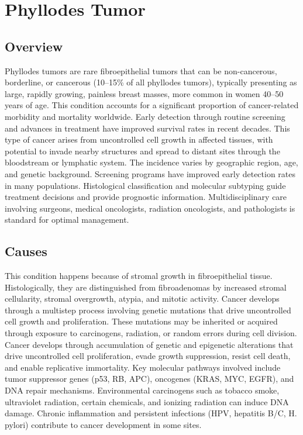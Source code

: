 \chapter{Phyllodes Tumor}
\label{sec:Phyllodes Tumor}

\section{Overview}
Phyllodes tumors are rare fibroepithelial tumors that can be non-cancerous, borderline, or cancerous (10--15\% of all phyllodes tumors), typically presenting as large, rapidly growing, painless breast masses, more common in women 40--50 years of age. This condition accounts for a significant proportion of cancer-related morbidity and mortality worldwide. Early detection through routine screening and advances in treatment have improved survival rates in recent decades. This type of cancer arises from uncontrolled cell growth in affected tissues, with potential to invade nearby structures and spread to distant sites through the bloodstream or lymphatic system. The incidence varies by geographic region, age, and genetic background. Screening programs have improved early detection rates in many populations. Histological classification and molecular subtyping guide treatment decisions and provide prognostic information. Multidisciplinary care involving surgeons, medical oncologists, radiation oncologists, and pathologists is standard for optimal management.
\section{Causes}
This condition happens because of stromal growth in fibroepithelial tissue. Histologically, they are distinguished from fibroadenomas by increased stromal cellularity, stromal overgrowth, atypia, and mitotic activity. Cancer develops through a multistep process involving genetic mutations that drive uncontrolled cell growth and proliferation. These mutations may be inherited or acquired through exposure to carcinogens, radiation, or random errors during cell division.     Cancer develops through accumulation of genetic and epigenetic alterations that drive uncontrolled cell proliferation, evade growth suppression, resist cell death, and enable replicative immortality. Key molecular pathways involved include tumor suppressor genes (p53, RB, APC), oncogenes (KRAS, MYC, EGFR), and DNA repair mechanisms. Environmental carcinogens such as tobacco smoke, ultraviolet radiation, certain chemicals, and ionizing radiation can induce DNA damage. Chronic inflammation and persistent infections (HPV, hepatitis B/C, H. pylori) contribute to cancer development in some sites.
